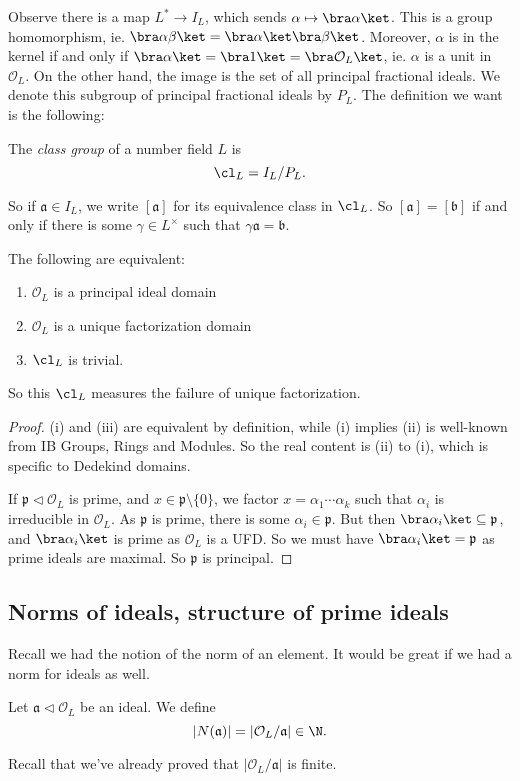 \documentclass[a4paper]{article}
\begin{document}
Observe there is a map $L^* \to I_L$, which sends $\alpha \mapsto \bra \alpha\ket$. This is a group homomorphism, ie. $\bra \alpha\beta\ket = \bra \alpha\ket \bra \beta\ket$. Moreover, $\alpha$ is in the kernel if and only if $\bra \alpha\ket = \bra 1\ket = \bra \mathcal{O}_L\ket$, ie. $\alpha$ is a unit in $\mathcal{O}_L$. On the other hand, the image is the set of all principal fractional ideals. We denote this subgroup of principal fractional ideals by $P_L$. The definition we want is the following:

\begin{defi}
  The \emph{class group} of a number field $L$ is
  \[
    \cl_L = I_L/P_L.
  \]
\end{defi}
So if $\mathfrak{a} \in I_L$, we write $[\mathfrak{a}]$ for its equivalence class in $\cl_L$. So $[\mathfrak{a}] = [\mathfrak{b}]$ if and only if there is some $\gamma\in L^\times$ such that $\gamma \mathfrak{a} = \mathfrak{b}$.

\begin{thm}
  The following are equivalent:
  \begin{enumerate}
    \item $\mathcal{O}_L$ is a principal ideal domain
    \item $\mathcal{O}_L$ is a unique factorization domain
    \item $\cl_L$ is trivial.
  \end{enumerate}
\end{thm}
So this $\cl_L$ measures the failure of unique factorization.
\begin{proof}
  (i) and (iii) are equivalent by definition, while (i) implies (ii) is well-known from IB Groups, Rings and Modules. So the real content is (ii) to (i), which is specific to Dedekind domains.

  If $\mathfrak{p} \lhd \mathcal{O}_L$ is prime, and $x \in \mathfrak{p} \setminus \{0\}$, we factor $x = \alpha_1 \cdots \alpha_k$ such that $\alpha_i$ is irreducible in $\mathcal{O}_L$. As $\mathfrak{p}$ is prime, there is some $\alpha_i \in \mathfrak{p}$. But then $\bra \alpha_i\ket \subseteq \mathfrak{p}$, and $\bra \alpha_i\ket$ is prime as $\mathcal{O}_L$ is a UFD. So we must have $\bra \alpha_i\ket = \mathfrak{p}$ as prime ideals are maximal. So $\mathfrak{p}$ is principal.
\end{proof}

\subsection{Norms of ideals, structure of prime ideals}
Recall we had the notion of the norm of an element. It would be great if we had a norm for ideals as well.
\begin{defi}
  Let $\mathfrak{a} \lhd \mathcal{O}_L$ be an ideal. We define
  \[
    |N(\mathfrak{a})| = |\mathcal{O}_L/\mathfrak{a}| \in \N.
  \]
\end{defi}
Recall that we've already proved that $|\mathcal{O}_L/\mathfrak{a}|$ is finite.
\end{document}
